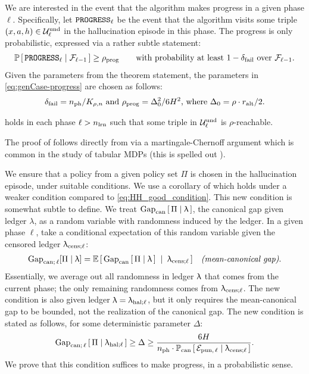 We are interested in the event that the algorithm makes progress in a given phase $\ell$. Specifically, let
$\mathtt{PROGRESS}_{\ell}$ be the event that the algorithm visits some triple $(x,a,h)\in\mathcal{U}^{\mathrm{und}}_{\ell}$ in the hallucination episode in this phase. The progress is only probabilistic, expressed via a rather subtle statement:
\begin{align}\label{eq:genCase-progress}
\operatorname{\mathbb{P}}\left[\,\mathtt{PROGRESS}_{\ell} \mid \mathcal{F}_{\ell-1}\,\right] \geq \rho_{\mathrm{prog}}
\qquad\text{with probability at least $1-\delta_{\mathrm{fail}}$ over $\mathcal{F}_{\ell-1}$}.
\end{align}
Given the parameters from the theorem statement, the parameters in \eqref{eq:genCase-progress} are chosen as follows:
\begin{align}\label{eq:genCase-params}
\text{$\delta_{\mathrm{fail}} = n_{\mathrm{ph}}/K_{\rho,n}$
and
$\rho_{\mathrm{prog}}=\Delta_0^2/6H^2$, where $\Delta_0 = \rho\cdot r_{\mathrm{alt}}/2$}.
\end{align}


\begin{lemma}[Progress]\label{lem:main_prob_lemma}
 holds in each phase $\ell > n_{\mathrm{lrn}}$ such that some triple in $\mathcal{U}^{\mathrm{und}}_{\ell}$ is $\rho$-reachable.
\end{lemma}

The proof of  follows directly from  via a martingale-Chernoff argument which is common in the study of tabular MDPs (this is spelled out ).

We ensure that a policy from a given policy set $\Pi$ is chosen in the hallucination episode, under suitable conditions. We use a corollary of  which holds under a weaker condition compared to  \eqref{eq:HH_good_condition}. This new condition is somewhat subtle to define. We treat
    $\mathrm{Gap}_{\mathrm{can}}\left[\,\Pi \mid \uplambda\,\right]$,
the canonical gap given ledger $\lambda$, as a random variable with randomness induced by the ledger. In a given phase $\ell$, take a conditional expectation of this random variable given the censored ledger $\uplambda_{\mathrm{cens};\ell}$:
\begin{align}\label{eq:mean-canonical-gap-defn}
\mathrm{Gap}_{\mathrm{can};\,\ell}[\Pi\mid \uplambda]
    &= \mathbb{E}\left[\, \mathrm{Gap}_{\mathrm{can}}\left[\,\Pi \mid \uplambda\,\right] \;\mid\; \uplambda_{\mathrm{cens};\ell} \,\right]
    &\text{\emph{(mean-canonical gap)}}.
\end{align}
Essentially, we average out all randomness in ledger $\uplambda$ that comes from the current phase; the only remaining randomness comes from $\uplambda_{\mathrm{cens};\ell}$. The new condition is also given ledger $\uplambda = \uplambda_{\mathrm{hal};\ell}$, but it only requires the mean-canonical gap to be bounded, not the realization of the canonical gap. The new condition is stated as follows, for some deterministic parameter $\Delta$:
\begin{align}\label{eq:HH-stronger-condition}
\mathrm{Gap}_{\mathrm{can};\,\ell}\left[\,\Pi \mid \uplambda_{\mathrm{hal};\ell}\,\right]
    \geq \Delta
    \geq \frac{6H}{n_{\mathrm{ph}} \cdot \operatorname{\mathbb{P}}_{\mathrm{can}}\left[\,\mathcal{E}_{\mathrm{pun},\,\ell} \mid \uplambda_{\mathrm{cens};\ell}\,\right]}.
\end{align}
We prove that this condition suffices to make progress, in a probabilistic sense.

